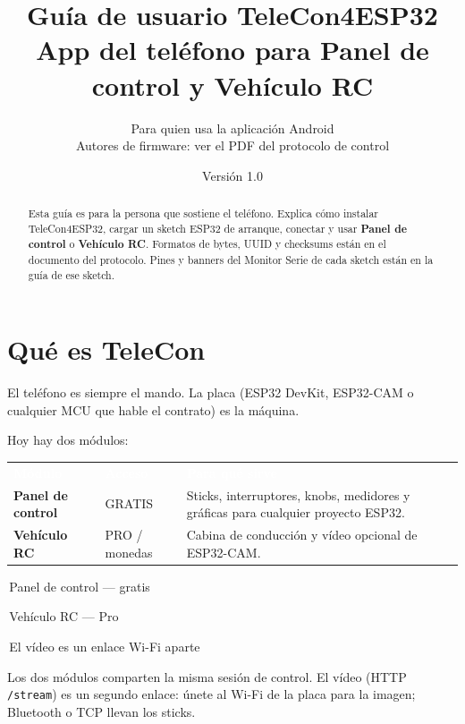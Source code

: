 \documentclass[12pt,a4paper]{article}
\title{Guía de usuario TeleCon4ESP32\\[0.35em]
\large App del teléfono para Panel de control y Vehículo RC}
\author{Para quien usa la aplicación Android\\
\small Autores de firmware: ver el PDF del protocolo de control}
\date{Versión 1.0 \quad 2026}
\newcommand{\thc}[1]{\textcolor{white}{\bfseries #1}}
\newcommand{\chip}[2]{\colorbox{#1}{\strut\,\scriptsize #2\,}}
\newcommand{\ui}[1]{\textsf{\textbf{#1}}}
\begin{document}
\maketitle

\begin{abstract}
Esta guía es para la persona que sostiene el teléfono.
Explica cómo instalar TeleCon4ESP32, cargar un sketch ESP32 de arranque,
conectar y usar \ui{Panel de control} o \ui{Vehículo RC}.
Formatos de bytes, UUID y checksums están en el documento del protocolo.
Pines y banners del Monitor Serie de cada sketch están en la guía de ese sketch.
\end{abstract}

\section{Qué es TeleCon}
\label{sec:what}

El teléfono es siempre el mando.
La placa (ESP32 DevKit, ESP32-CAM o cualquier MCU que hable el contrato)
es la máquina.

Hoy hay dos módulos:

\begin{center}
\renewcommand{\arraystretch}{1.25}
\begin{tabular}{>{\raggedright\arraybackslash}p{3.4cm}
                >{\centering\arraybackslash}p{2.2cm}
                >{\raggedright\arraybackslash}p{6.6cm}}
\rowcolor{TblHead}
\thc{Módulo} & \thc{Acceso} & \thc{Para qué sirve} \\
\rowcolor{TblChan}
\ui{Panel de control} & GRATIS & Sticks, interruptores, knobs, medidores y
gráficas para cualquier proyecto ESP32. \\
\rowcolor{TblSum}
\ui{Vehículo RC} & PRO / monedas & Cabina de conducción y vídeo opcional
de ESP32-CAM. \\
\end{tabular}
\end{center}

\vspace{0.4em}
{\sffamily\scriptsize
\chip{TblChan}{Panel de control --- gratis}
\chip{TblSum}{Vehículo RC --- Pro}
\chip{TblTelem}{El vídeo es un enlace Wi-Fi aparte}}

Los dos módulos comparten la misma sesión de control.
El vídeo (HTTP \texttt{/stream}) es un segundo enlace: únete al Wi-Fi de la
placa para la imagen; Bluetooth o TCP llevan los sticks.
\end{document}
